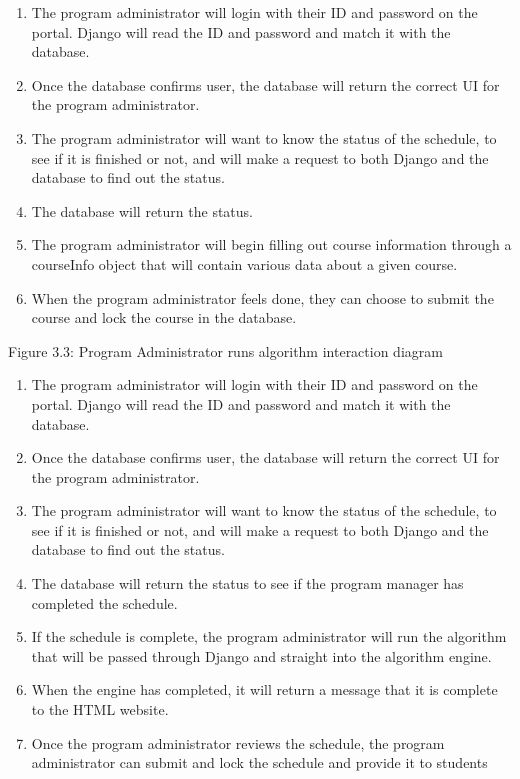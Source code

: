 \documentclass[12pt,article]{memoir}
\begin{document}
\begin{enumerate}
\item The program administrator will login with their ID and password on the portal. Django will read the ID and password and match it with the database. 
\item Once the database confirms user, the database will return the correct UI for the program administrator.
\item The program administrator will want to know the status of the schedule, to see if it is finished or not, and will make a request to both Django and the database to find out the status. 
\item The database will return the status. 
\item The program administrator will begin filling out course information through a courseInfo object that will contain various data about a given course.
\item When the program administrator feels done, they can choose to submit the course and lock the course in the database. 
\end{enumerate}


 Figure 3.3: Program Administrator runs algorithm interaction diagram

\begin{enumerate}
\item The program administrator will login with their ID and password on the portal. Django will read the ID and password and match it with the database. 
\item Once the database confirms user, the database will return the correct UI for the program administrator.
\item The program administrator will want to know the status of the schedule, to see if it is finished or not, and will make a request to both Django and the database to find out the status. 
\item The database will return the status to see if the program manager has completed the schedule. 
\item If the schedule is complete, the program administrator will run the algorithm that will be passed through Django and straight into the algorithm engine.
\item When the engine has completed, it will return a message that it is complete to the HTML website. 
\item Once the program administrator reviews the schedule, the program administrator can submit and lock the schedule and provide it to students
\end{enumerate}
\end{document}
